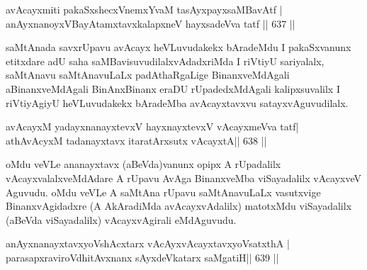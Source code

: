 \begin{shl}
avAcayxmiti pakaSxshecxVnemxYvaM tasAyxpayxsaMBavAtf | \\
anAyxnanoyxVBayAtamxtavxkalapxneV hayxsadeVva tatf \hfill||  637 ||  
\end{shl}

\begin{artha}
saMtAnada savxrUpavu avAcayx heVLuvudakekx bAradeMdu I pakaSxvanunx etitxdare adU saha saMBavisuvudilalxvAdadxriMda I riVtiyU sariyalalx, saMtAnavu saMtAnavuLaLx padAthaRgaLige BinanxveMdAgali aBinanxveMdAgali BinAnxBinanx eraDU rUpadedxMdAgali kalipxsuvalilx I riVtiyAgiyU heVLuvudakekx bAradeMba avAcayxtavxvu satayxvAguvudilalx.
\end{artha}

\begin{shl}
avAcayxM yadayxnanayxtevxV hayxnayxtevxV vAcayxmeVva tatf\footnotemark[1] | \\
athAvAcyxM tadanayxtavx itaratArxsutx vAcayxtA\footnotemark[2] \hfill ||  638 ||  
\end{shl}

\begin{artha}

oMdu veVLe ananayxtavx (aBeVda)vanunx opipx A rUpadalilx vAcayxvalalxveMdAdare A rUpavu AvAga BinanxveMba viSayadalilx vAcayxveV Aguvudu. oMdu veVLe A saMtAna rUpavu saMtAnavuLaLx vasutxvige BinanxvAgidadxre (A AkAradiMda avAcayxvAdalilx) matotxMdu viSayadalilx (aBeVda viSayadalilx) vAcayxvAgirali eMdAguvudu.
\end{artha}

\begin{shl}
\footnotemark[3]anAyxnanayxtavxyoVshAcxtarx vAcAyxvAcayxtavxyoVsatxthA | \\
parasapxraviroVdhitAvxnanx sAyxdeVkatarx saMgatiH\hfill ||  639 ||  
\end{shl}

